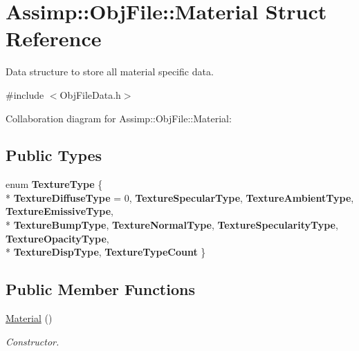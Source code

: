 \hypertarget{struct_assimp_1_1_obj_file_1_1_material}{\section{Assimp\+:\+:Obj\+File\+:\+:Material Struct Reference}
\label{struct_assimp_1_1_obj_file_1_1_material}
}


Data structure to store all material specific data.  




{\ttfamily \#include $<$Obj\+File\+Data.\+h$>$}



Collaboration diagram for Assimp\+:\+:Obj\+File\+:\+:Material\+:
\subsection*{Public Types}
\begin{DoxyCompactItemize}
\item 
\hypertarget{struct_assimp_1_1_obj_file_1_1_material_a3b8ba23a8a08e50816d621faa19c339e}{enum {\bfseries Texture\+Type} \{ \\*
{\bfseries Texture\+Diffuse\+Type} = 0, 
{\bfseries Texture\+Specular\+Type}, 
{\bfseries Texture\+Ambient\+Type}, 
{\bfseries Texture\+Emissive\+Type}, 
\\*
{\bfseries Texture\+Bump\+Type}, 
{\bfseries Texture\+Normal\+Type}, 
{\bfseries Texture\+Specularity\+Type}, 
{\bfseries Texture\+Opacity\+Type}, 
\\*
{\bfseries Texture\+Disp\+Type}, 
{\bfseries Texture\+Type\+Count}
 \}}\label{struct_assimp_1_1_obj_file_1_1_material_a3b8ba23a8a08e50816d621faa19c339e}

\end{DoxyCompactItemize}
\subsection*{Public Member Functions}
\begin{DoxyCompactItemize}
\item 
\hypertarget{struct_assimp_1_1_obj_file_1_1_material_af5921aad17dae7561e58d100106db0ef}{\hyperlink{struct_assimp_1_1_obj_file_1_1_material_af5921aad17dae7561e58d100106db0ef}{Material} ()}\label{struct_assimp_1_1_obj_file_1_1_material_af5921aad17dae7561e58d100106db0ef}

\begin{DoxyCompactList}\small\item\em Constructor. \end{DoxyCompactList}\end{DoxyCompactItemize}

